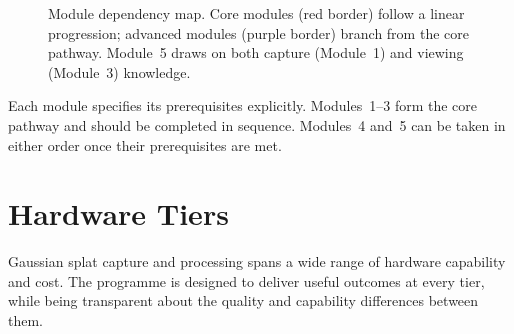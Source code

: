 \begin{figure}[htbp]
  \centering
  \caption{Module dependency map. Core modules (red border) follow a linear progression; advanced modules (purple border) branch from the core pathway. Module~5 draws on both capture (Module~1) and viewing (Module~3) knowledge.}
  \label{fig:module-map}
\end{figure}

Each module specifies its prerequisites explicitly. Modules~1--3 form the core pathway and should be completed in sequence. Modules~4 and~5 can be taken in either order once their prerequisites are met.

\section{Hardware Tiers}
\label{sec:train-hardware}

Gaussian splat capture and processing spans a wide range of hardware capability and cost. The programme is designed to deliver useful outcomes at every tier, while being transparent about the quality and capability differences between them.

